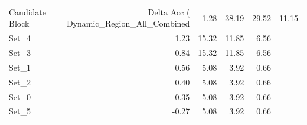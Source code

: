 \begin{tabular}{lrrrr}
\toprule
Candidate Block & Delta Acc (%
\midrule
Dynamic_Region_All_Combined & 1.28 & 38.19 & 29.52 & 11.15 \\
Set_4 & 1.23 & 15.32 & 11.85 & 6.56 \\
Set_3 & 0.84 & 15.32 & 11.85 & 6.56 \\
Set_1 & 0.56 & 5.08 & 3.92 & 0.66 \\
Set_2 & 0.40 & 5.08 & 3.92 & 0.66 \\
Set_0 & 0.35 & 5.08 & 3.92 & 0.66 \\
Set_5 & -0.27 & 5.08 & 3.92 & 0.66 \\
\bottomrule
\end{tabular}

